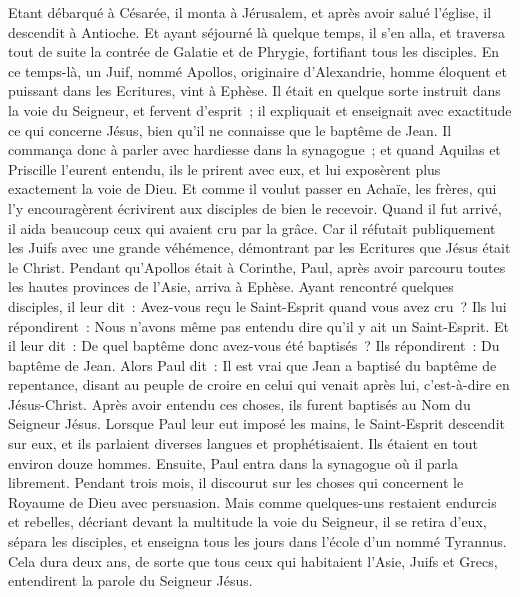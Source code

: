 \begin{multicols}{2}
Etant débarqué à Césarée, il monta à Jérusalem, et après avoir salué l'église, il descendit à Antioche.
Et ayant séjourné là quelque temps, il s'en alla, et traversa tout de suite la contrée de Galatie et de Phrygie, fortifiant tous les disciples.
En ce temps-là, un Juif, nommé Apollos, originaire d'Alexandrie, homme éloquent et puissant dans les Ecritures, vint à Ephèse.
Il était en quelque sorte instruit dans la voie du Seigneur, et fervent d'esprit~; il expliquait et enseignait avec exactitude ce qui concerne Jésus, bien qu'il ne connaisse que le baptême de Jean.
Il commança donc à parler avec hardiesse dans la synagogue~; et quand Aquilas et Priscille l'eurent entendu, ils le prirent avec eux, et lui exposèrent plus exactement la voie de Dieu.
Et comme il voulut passer en Achaïe, les frères, qui l'y encouragèrent écrivirent aux disciples de bien le recevoir. Quand il fut arrivé, il aida beaucoup ceux qui avaient cru par la grâce.
Car il réfutait publiquement les Juifs avec une grande véhémence, démontrant par les Ecritures que Jésus était le Christ.
\VerseOne{}Pendant qu'Apollos était à Corinthe, Paul, après avoir parcouru toutes les hautes provinces de l'Asie, arriva à Ephèse. Ayant rencontré quelques disciples, il leur dit~:
Avez-vous reçu le Saint-Esprit quand vous avez cru~? Ils lui répondirent~: Nous n'avons même pas entendu dire qu'il y ait un Saint-Esprit.
Et il leur dit~: De quel baptême donc avez-vous été baptisés~? Ils répondirent~: Du baptême de Jean.
Alors Paul dit~: Il est vrai que Jean a baptisé du baptême de repentance, disant au peuple de croire en celui qui venait après lui, c'est-à-dire en Jésus-Christ.
Après avoir entendu ces choses, ils furent baptisés au Nom du Seigneur Jésus.
Lorsque Paul leur eut imposé les mains, le Saint-Esprit descendit sur eux, et ils parlaient diverses langues et prophétisaient.
Ils étaient en tout environ douze hommes.
Ensuite, Paul entra dans la synagogue où il parla librement. Pendant trois mois, il discourut sur les choses qui concernent le Royaume de Dieu avec persuasion.
Mais comme quelques-uns restaient endurcis et rebelles, décriant devant la multitude la voie du Seigneur, il se retira d'eux, sépara les disciples, et enseigna tous les jours dans l'école d'un nommé Tyrannus.
Cela dura deux ans, de sorte que tous ceux qui habitaient l'Asie, Juifs et Grecs, entendirent la parole du Seigneur Jésus.

\end{multicols}
